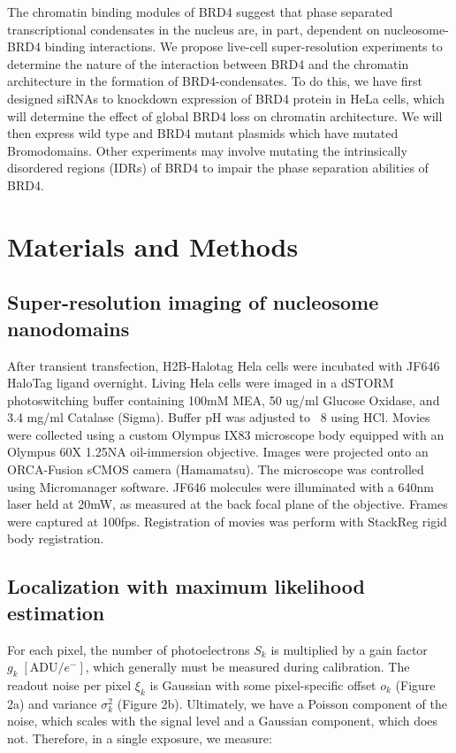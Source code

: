 \documentclass{ucetd}
\begin{document}
The chromatin binding modules of BRD4 suggest that phase separated transcriptional condensates in the nucleus are, in part, dependent on nucleosome-BRD4 binding interactions. We propose live-cell super-resolution experiments to determine the nature of the interaction between BRD4 and the chromatin architecture in the formation of BRD4-condensates. To do this, we have first designed siRNAs to knockdown expression of BRD4 protein in HeLa cells, which will determine the effect of global BRD4 loss on chromatin architecture. We will then express wild type and BRD4 mutant plasmids which have mutated Bromodomains. Other experiments may involve mutating the intrinsically disordered regions (IDRs) of BRD4 to impair the phase separation abilities of BRD4. 


\section{Materials and Methods}

\subsection{Super-resolution imaging of nucleosome nanodomains}

After transient transfection, H2B-Halotag Hela cells were incubated with JF646 HaloTag ligand overnight. Living Hela cells were imaged in a dSTORM photoswitching buffer containing 100mM MEA, 50 ug/ml Glucose Oxidase, and 3.4 mg/ml Catalase (Sigma). Buffer pH was adjusted to ~8 using HCl. Movies were collected using a custom Olympus IX83 microscope body equipped with an Olympus 60X 1.25NA oil-immersion objective. Images were projected onto an ORCA-Fusion sCMOS camera (Hamamatsu). The microscope was controlled using Micromanager software. JF646 molecules were illuminated with a 640nm laser held at 20mW, as measured at the back focal plane of the objective.  Frames were captured at 100fps. Registration of movies was perform with StackReg rigid body registration. 

\subsection{Localization with maximum likelihood estimation}

For each pixel, the number of photoelectrons $S_{k}$ is  multiplied by a gain factor $g_{k} \;[\mathrm{ADU}/e^{-}]$, which generally must be measured during calibration. The readout noise per pixel $\xi_{k}$ is Gaussian with some pixel-specific offset $o_{k}$ (Figure 2a) and variance $\sigma_{k}^{2}$ (Figure 2b). Ultimately, we have a Poisson component of the noise, which scales with the signal level and a Gaussian component, which does not. Therefore, in a single exposure, we measure: 
\end{document}
